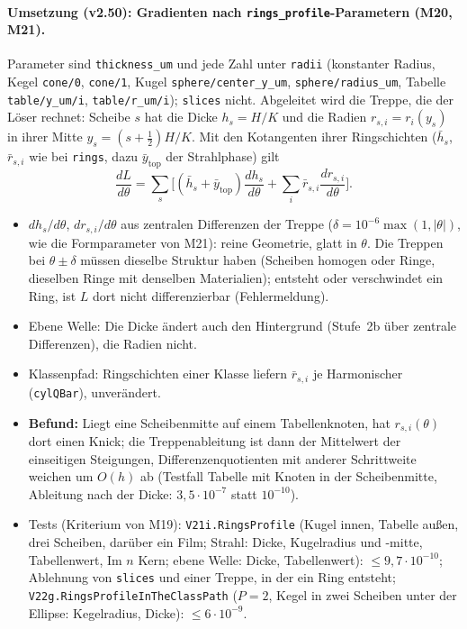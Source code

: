 \paragraph{Umsetzung (v2.50): Gradienten nach \texttt{rings\_profile}-Parametern (M20, M21).}
Parameter sind \verb|thickness_um| und jede Zahl unter \verb|radii| (konstanter Radius, Kegel \verb|cone/0|, \verb|cone/1|,
Kugel \verb|sphere/center_y_um|, \verb|sphere/radius_um|, Tabelle \verb|table/y_um/i|, \verb|table/r_um/i|); \verb|slices| nicht.
Abgeleitet wird die Treppe, die der Löser rechnet: Scheibe $s$ hat die Dicke $h_s=H/K$ und die Radien $r_{s,i}=r_i(y_s)$
in ihrer Mitte $y_s=(s+\tfrac12)H/K$. Mit den Kotangenten ihrer Ringschichten ($\bar h_s$, $\bar r_{s,i}$ wie bei
\verb|rings|, dazu $\bar y_{\text{top}}$ der Strahlphase) gilt
\[
  \frac{dL}{d\theta}=\sum_s\Big[(\bar h_s+\bar y_{\text{top}})\frac{dh_s}{d\theta}+\sum_i\bar r_{s,i}\frac{dr_{s,i}}{d\theta}\Big].
\]
\begin{itemize}[nosep]
  \item $dh_s/d\theta$, $dr_{s,i}/d\theta$ aus zentralen Differenzen der Treppe ($\delta=10^{-6}\max(1,|\theta|)$, wie die
        Formparameter von M21): reine Geometrie, glatt in $\theta$. Die Treppen bei $\theta\pm\delta$ müssen dieselbe Struktur
        haben (Scheiben homogen oder Ringe, dieselben Ringe mit denselben Materialien); entsteht oder verschwindet ein
        Ring, ist $L$ dort nicht differenzierbar (Fehlermeldung).
  \item Ebene Welle: Die Dicke ändert auch den Hintergrund (Stufe~2b über zentrale Differenzen), die Radien nicht.
  \item Klassenpfad: Ringschichten einer Klasse liefern $\bar r_{s,i}$ je Harmonischer (\verb|cylQBar|), unverändert.
  \item \textbf{Befund:} Liegt eine Scheibenmitte auf einem Tabellenknoten, hat $r_{s,i}(\theta)$ dort einen Knick; die
        Treppenableitung ist dann der Mittelwert der einseitigen Steigungen, Differenzenquotienten mit anderer Schrittweite
        weichen um $O(h)$ ab (Testfall Tabelle mit Knoten in der Scheibenmitte, Ableitung nach der Dicke: $3{,}5\cdot10^{-7}$
        statt $10^{-10}$).
  \item Tests (Kriterium von M19): \verb|V21i.RingsProfile| (Kugel innen, Tabelle außen, drei Scheiben, darüber ein Film;
        Strahl: Dicke, Kugelradius und -mitte, Tabellenwert, Im $n$ Kern; ebene Welle: Dicke, Tabellenwert):
        $\le9{,}7\cdot10^{-10}$; Ablehnung von \verb|slices| und einer Treppe, in der ein Ring entsteht;
        \verb|V22g.RingsProfileInTheClassPath| ($P=2$, Kegel in zwei Scheiben unter der Ellipse: Kegelradius, Dicke):
        $\le6\cdot10^{-9}$.
\end{itemize}

